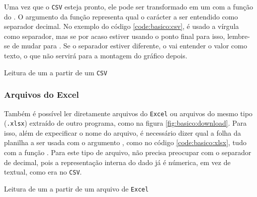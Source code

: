     Uma vez que o \texttt{CSV} esteja pronto, ele pode ser transformado em um \dataframe com a função  do \pandas. O argumento  da função representa qual o carácter a ser entendido como separador decimal. No exemplo do código \ref{code:basico:csv}, é usado a vírgula como separador, mas se por acaso estiver usando o ponto final para isso, lembre-se de mudar para . Se o separador estiver diferente, o \pandas vai entender o valor como texto, o que não servirá para a montagem do gráfico depois.

    \begin{listing}[H]
        \caption{Leitura de um \dataframe a partir de um \texttt{CSV}}
        \label{code:basico:csv}

    \end{listing}


\subsubsection{Arquivos do Excel}

    Também é possível ler diretamente arquivos do \texttt{Excel} ou arquivos do mesmo tipo (\texttt{.xlsx}) extraído de outro programa, como na figura \ref{fig:basico:download}. Para isso, além de expecificar o nome do arquivo, é necessário dizer qual a folha da planilha a ser usada com o argumento , como no código \ref{code:basico:xlsx}, tudo com a função . Para este tipo de arquivo, não precisa preocupar com o separador de decimal, pois a representação interna do dado já é númerica, em vez de textual, como era no \texttt{CSV}.

    \begin{listing}[H]
        \caption{Leitura de um \dataframe a partir de um arquivo de \texttt{Excel}}
        \label{code:basico:xlsx}

    \end{listing}

